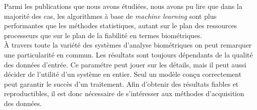 Parmi les publications que nous avons étudiées, nous avons pu lire que dans la majorité des cas, les algorithmes à base de \textit{machine learning} sont plus performantes que les méthodes statistiques, autant sur le plan des ressources processeurs\cite{Hu2008} que sur le plan de la fiabilité en termes biométriques\cite{giotBenchmark}.\\

À travers toute la variété des systèmes d'analyse biométriques on peut remarquer une particularité en commun. Les résultats sont toujours dépendants de la qualité des données d'entrée. Ce paramétre peut jouer sur les détails, mais il peut aussi décider de l'utilité d'un système en entier. Seul un modèle conçu correctement peut garantir le succès d'un traitement. Afin d'obtenir des résultats fiables et reproductibles, il est donc nécessaire de s'intéresser aux méthodes d'acquisition des données.



